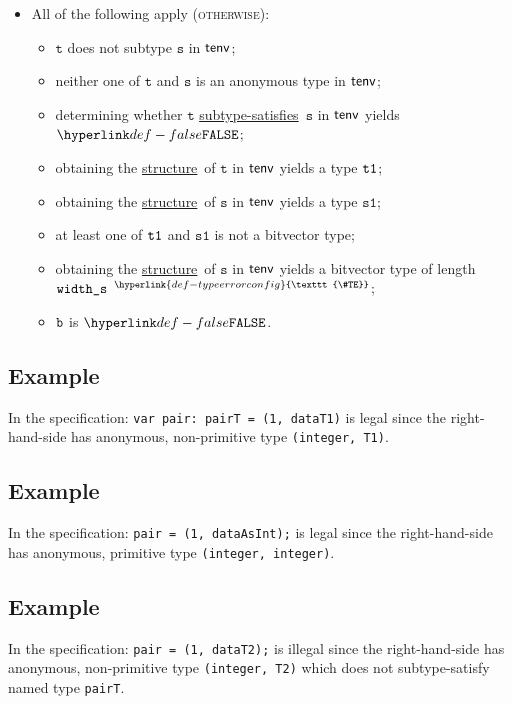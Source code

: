 \documentclass{book}
\newcommand\TypeErrorConfig[0]{\hyperlink{def-typeerrorconfig}{\texttt{\#TE}}}
\newcommand\ProseOrTypeError[0]{\hyperlink{def-proseortypeerror}{$^{\TypeErrorConfig}$}}
\newcommand\structure[0]{\hyperlink{def-structure}{structure}}
\newcommand\subtypesatisfies[0]{\hyperlink{def-subtypesatisfies}{subtype-satisfies}}
\newcommand\vt[0]{\texttt{t}}
\newcommand\vs[0]{\texttt{s}}
\newcommand\vsone[0]{\texttt{s1}}
\begin{document}
\begin{itemize}
  \item All of the following apply (\textsc{otherwise}):
  \begin{itemize}
    \item $\vt$ does not subtype $\vs$ in $\textsf{tenv}$;
    \item neither one of $\vt$ and $\vs$ is an anonymous type in $\textsf{tenv}$;
    \item determining whether $\vt$ \subtypesatisfies\ $\vs$ in $\textsf{tenv}$ yields $\False$;
    \item obtaining the \structure\ of $\vt$ in $\textsf{tenv}$ yields a type $\texttt{t1}$;
    \item obtaining the \structure\ of $\vs$ in $\textsf{tenv}$ yields a type $\vsone$;
    \item at least one of $\texttt{t1}$ and $\vsone$ is not a bitvector type;
    \item obtaining the \structure\ of $\vs$ in $\textsf{tenv}$ yields a bitvector type of length $\texttt{width\_s}$ \ProseOrTypeError;
    \item $\texttt{b}$ is $\False$.
  \end{itemize}
\end{itemize}

\subsection{Example}
In the specification:
\texttt{var pair: pairT = (1, dataT1)} is legal since the right-hand-side has
anonymous, non-primitive type \texttt{(integer, T1)}.

\subsection{Example}
In the specification:
\texttt{pair = (1, dataAsInt);} is legal since the right-hand-side has anonymous,
primitive type \texttt{(integer, integer)}.

\subsection{Example}
In the specification:
\texttt{pair = (1, dataT2);} is illegal since the right-hand-side has anonymous,
non-primitive type \texttt{(integer, T2)} which does not subtype-satisfy named
type \texttt{pairT}.
\end{document}

